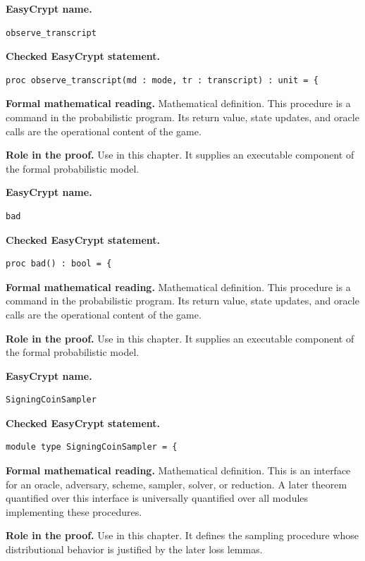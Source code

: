 \begin{formaldefinition}
\noindent\textbf{EasyCrypt name.}
\begin{lstlisting}[language=EasyCrypt,basicstyle=\ttfamily\scriptsize]
observe_transcript
\end{lstlisting}
\noindent\textbf{Checked EasyCrypt statement.}
\begin{lstlisting}[language=EasyCrypt,basicstyle=\ttfamily\scriptsize]
proc observe_transcript(md : mode, tr : transcript) : unit = {
\end{lstlisting}
\noindent\textbf{Formal mathematical reading.}
Mathematical definition. This procedure is a command in the probabilistic program.  Its return value, state updates, and oracle calls are the operational content of the game.

\noindent\textbf{Role in the proof.}
Use in this chapter. It supplies an executable component of the formal probabilistic model.

\end{formaldefinition}

\begin{formaldefinition}
\noindent\textbf{EasyCrypt name.}
\begin{lstlisting}[language=EasyCrypt,basicstyle=\ttfamily\scriptsize]
bad
\end{lstlisting}
\noindent\textbf{Checked EasyCrypt statement.}
\begin{lstlisting}[language=EasyCrypt,basicstyle=\ttfamily\scriptsize]
proc bad() : bool = {
\end{lstlisting}
\noindent\textbf{Formal mathematical reading.}
Mathematical definition. This procedure is a command in the probabilistic program.  Its return value, state updates, and oracle calls are the operational content of the game.

\noindent\textbf{Role in the proof.}
Use in this chapter. It supplies an executable component of the formal probabilistic model.

\end{formaldefinition}

\begin{formaldefinition}
\noindent\textbf{EasyCrypt name.}
\begin{lstlisting}[language=EasyCrypt,basicstyle=\ttfamily\scriptsize]
SigningCoinSampler
\end{lstlisting}
\noindent\textbf{Checked EasyCrypt statement.}
\begin{lstlisting}[language=EasyCrypt,basicstyle=\ttfamily\scriptsize]
module type SigningCoinSampler = {
\end{lstlisting}
\noindent\textbf{Formal mathematical reading.}
Mathematical definition. This is an interface for an oracle, adversary, scheme, sampler, solver, or reduction.  A later theorem quantified over this interface is universally quantified over all modules implementing these procedures.

\noindent\textbf{Role in the proof.}
Use in this chapter. It defines the sampling procedure whose distributional behavior is justified by the later loss lemmas.

\end{formaldefinition}

